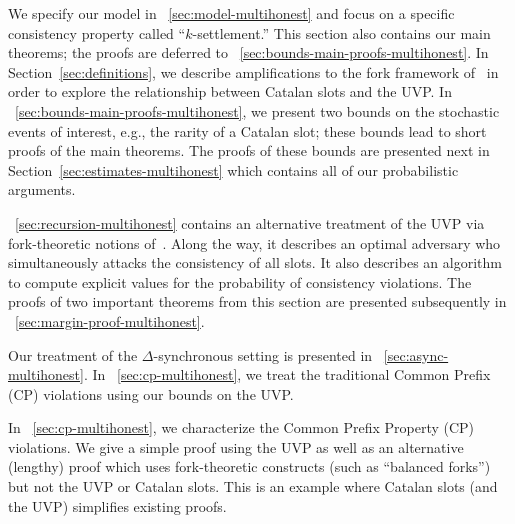 We specify our model in \Section~\ref{sec:model-multihonest} and focus on a
specific consistency property called ``$k$-settlement.''  This section
also contains our main theorems; the proofs are deferred to
\Section~\ref{sec:bounds-main-proofs-multihonest}.  In
Section~\ref{sec:definitions}, we describe amplifications
to the fork framework of~\cite{LinearConsistency} in order to
explore the relationship between Catalan slots and the UVP. 
In \Section~\ref{sec:bounds-main-proofs-multihonest},
we present two bounds on the stochastic events of interest, e.g., the
rarity of a Catalan slot; these bounds lead to short proofs of the
main theorems.  The proofs of these bounds are presented next in
Section~\ref{sec:estimates-multihonest} which contains all of our probabilistic
arguments.  

\Section~\ref{sec:recursion-multihonest} contains an alternative treatment 
of the UVP via fork-theoretic notions of~\cite{LinearConsistency}. 
Along the way, it describes an optimal adversary who simultaneously attacks the consistency of all slots. 
It also describes an algorithm to compute explicit values 
for the probability of consistency violations. 
The proofs of two important theorems from this section 
are presented subsequently in \Section~\ref{sec:margin-proof-multihonest}.


Our treatment of the $\Delta$-synchronous setting is
presented in \Section~\ref{sec:async-multihonest}.  In \Section~\ref{sec:cp-multihonest}, we
treat the traditional Common Prefix (CP) violations using our bounds
on the UVP.  

In \Section~\ref{sec:cp-multihonest}, 
we characterize the Common Prefix Property (CP) violations. 
We give a simple proof using the UVP as well as 
an alternative (lengthy) proof which uses fork-theoretic constructs (such as ``balanced forks'') 
but not the UVP or Catalan slots. 
This is an example where Catalan slots (and the UVP) simplifies existing proofs.



